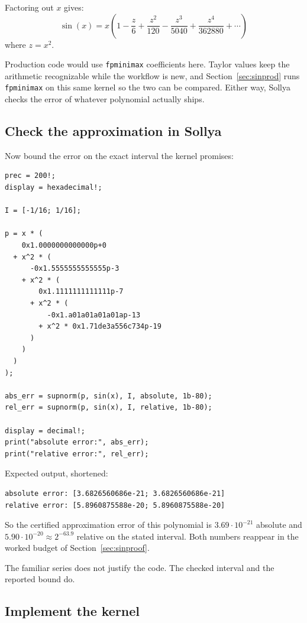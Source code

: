 \documentclass[manuscript, nonacm]{acmart}
\begin{document}
  Factoring out $x$ gives:
  \[
    \sin(x) = x\!\left(1 - \frac{z}{6} + \frac{z^2}{120} - \frac{z^3}{5040} +
                   \frac{z^4}{362880} + \cdots\right)
  \]
  where $z = x^2$.

  Production code would use \texttt{fpminimax} coefficients here. Taylor values
  keep the arithmetic recognizable while the workflow is new, and
  Section~\ref{sec:sinprod} runs \texttt{fpminimax} on this same kernel so the two
  can be compared. Either way, Sollya checks the error of whatever polynomial
  actually ships.

  \subsection{Check the approximation in Sollya}

  Now bound the error on the exact interval the kernel promises:
  \begin{lstlisting}[style=sollya]
prec = 200!;
display = hexadecimal!;

I = [-1/16; 1/16];

p = x * (
    0x1.0000000000000p+0
  + x^2 * (
      -0x1.5555555555555p-3
    + x^2 * (
        0x1.1111111111111p-7
      + x^2 * (
          -0x1.a01a01a01a01ap-13
        + x^2 * 0x1.71de3a556c734p-19
      )
    )
  )
);

abs_err = supnorm(p, sin(x), I, absolute, 1b-80);
rel_err = supnorm(p, sin(x), I, relative, 1b-80);

display = decimal!;
print("absolute error:", abs_err);
print("relative error:", rel_err);
  \end{lstlisting}

  Expected output, shortened:

  \begin{lstlisting}[style=output]
absolute error: [3.6826560686e-21; 3.6826560686e-21]
relative error: [5.8960875588e-20; 5.8960875588e-20]
  \end{lstlisting}

  So the certified approximation error of this polynomial is
  $3.69 \cdot 10^{-21}$ absolute and $5.90 \cdot 10^{-20} \approx 2^{-63.9}$
  relative on the stated interval. Both numbers reappear in the worked
  budget of Section~\ref{sec:sinproof}.

  The familiar series does not justify the code. The checked interval and the
  reported bound do.

  \subsection{Implement the kernel}
\end{document}
